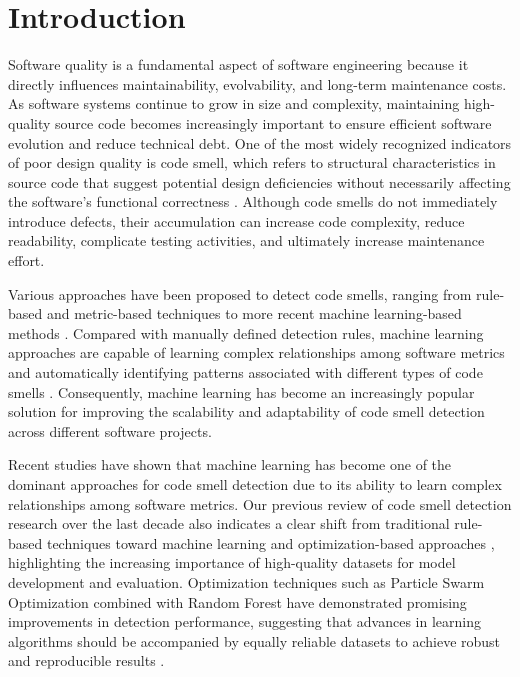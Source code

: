 \documentclass[]{einformatica}
\begin{document}
\maketitle 
 

\section{Introduction}\label{sec:Introduction}

Software quality is a fundamental aspect of software engineering because it directly influences maintainability, evolvability, and long-term maintenance costs. As software systems continue to grow in size and complexity, maintaining high-quality source code becomes increasingly important to ensure efficient software evolution and reduce technical debt. One of the most widely recognized indicators of poor design quality is code smell, which refers to structural characteristics in source code that suggest potential design deficiencies without necessarily affecting the software's functional correctness \cite{Fowler1999}\cite{Palomba2018}. Although code smells do not immediately introduce defects, their accumulation can increase code complexity, reduce readability, complicate testing activities, and ultimately increase maintenance effort.

Various approaches have been proposed to detect code smells, ranging from rule-based and metric-based techniques to more recent machine learning-based methods \cite{Pereira_dos_Reis_2021}\cite{THAKUR2026112784}. Compared with manually defined detection rules, machine learning approaches are capable of learning complex relationships among software metrics and automatically identifying patterns associated with different types of code smells \cite{THAKUR2026112784}\cite{Alodibat2026}\cite{MESBAH2026108242}. Consequently, machine learning has become an increasingly popular solution for improving the scalability and adaptability of code smell detection across different software projects.

Recent studies have shown that machine learning has become one of the dominant approaches for code smell detection due to its ability to learn complex relationships among software metrics. Our previous review of code smell detection research over the last decade also indicates a clear shift from traditional rule-based techniques toward machine learning and optimization-based approaches \cite{WibowoICITEE2025}, highlighting the increasing importance of high-quality datasets for model development and evaluation. Optimization techniques such as Particle Swarm Optimization combined with Random Forest have demonstrated promising improvements in detection performance, suggesting that advances in learning algorithms should be accompanied by equally reliable datasets to achieve robust and reproducible results \cite{Madeyski2017}\cite{Wibowo2026}\cite{Bishop2026}\cite{Destefanis2026}.
\end{document}
